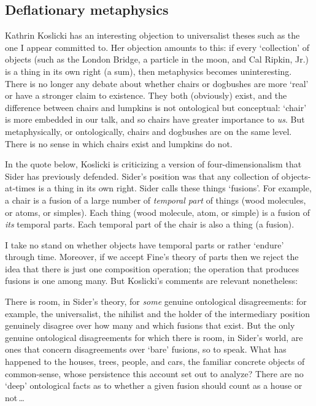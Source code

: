\documentclass[11pt]{article}
\newenvironment{squote}{%
\begin{spacing}{1}
\begin{list}{}{%
\setlength{\labelwidth}{0pt}%
\rightmargin\leftmargin%
}
\item\relax
}{%
\end{list}%
\end{spacing}
}
\begin{document}
\begin{spacing}{1.5}
\subsection{Deflationary metaphysics}
\label{deflate}
Kathrin Koslicki has an interesting objection to universalist theses
such as the one I appear committed to.  Her objection amounts to this:
if every `collection' of objects (such as the London Bridge, a
particle in the moon, and Cal Ripkin, Jr.) is a thing in its own right
(a sum), then metaphysics becomes uninteresting.  There is no longer
any debate about whether chairs or dogbushes are more `real' or have a
stronger claim to existence.  They both (obviously) exist, and the
difference between chairs and lumpkins is not ontological but
conceptual: `chair' is more embedded in our talk, and so chairs have
greater importance to {\em us}.  But metaphysically, or ontologically,
chairs and dogbushes are on the same level.  There is no sense in
which chairs exist and lumpkins do not.

In the quote below, Koslicki is criticizing a version of
four-dimensionalism that Sider has previously defended.  Sider's
position was that any collection of objects-at-times is a thing in its
own right.  Sider calls these things `fusions'.  For example, a chair
is a fusion of a large number of {\em temporal part} of things (wood
molecules, or atoms, or simples).  Each thing (wood molecule, atom, or
simple) is a fusion of {\em its} temporal parts.  Each temporal part
of the chair is also a thing (a fusion).

I take no stand on whether objects have temporal parts or rather
`endure' through time.  Moreover, if we accept Fine's theory of parts
then we reject the idea that there is just one composition operation;
the operation that produces fusions is one among many.  But Koslicki's
comments are relevant nonetheless:

\begin{squote}
There is room, in Sider's theory, for {\em some} genuine ontological
disagreements: for example, the universalist, the nihilist and the
holder of the intermediary position genuinely disagree over how many
and which fusions that exist.  But the only genuine ontological
disagreements for which there is room, in Sider's world, are ones that
concern disagreements over `bare' fusions, so to speak.  What has
happened to the houses, trees, people, and cars, the familiar concrete
objects of common-sense, whose persistence this account set out to
analyze?  There are no `deep' ontological facts as to whether a given
fusion should count as a house or not\,\ldots


\end{squote}
\end{spacing}
\end{document}
